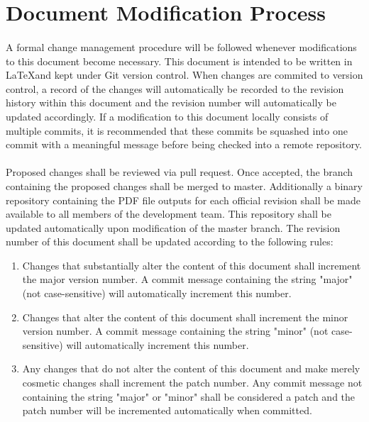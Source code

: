 \section{Document Modification Process}
\paragraph*{}
    A formal change management procedure will be followed whenever modifications
    to this document become necessary. This document is intended to be written in
    \LaTeX and kept under
    Git version control. When changes are commited to version control, a record
    of the changes will automatically be recorded to the revision history within this document and the
    revision number will automatically be updated accordingly. If a modification to this document
    locally consists of multiple commits, it is recommended that these commits be
    squashed into one commit with a meaningful message before being checked into a
    remote repository.

\paragraph*{}
    Proposed changes shall be reviewed via pull request. Once
    accepted, the branch containing the proposed changes shall be merged to master. 
    Additionally a binary repository containing the PDF file outputs for each official revision
    shall be made available to all members of the development team. This repository
    shall be updated automatically upon modification of the master branch. The revision     number of this document shall be updated according to the following rules:

    \begin{enumerate}
        \item Changes that substantially alter the content of this document shall
                increment the major version number. A commit message containing the
                string "major" (not case-sensitive) will automatically increment this
                number.
        \item Changes that alter the content of this document shall increment the
                minor version number. A commit message containing the string "minor"
                (not case-sensitive) will automatically increment this number.
        \item Any changes that do not alter the content of this document and make
                merely cosmetic changes shall increment the patch number.
                Any commit message not containing the string "major" or "minor" shall be
                considered a patch and the patch number will be
                incremented automatically when committed.
    \end{enumerate}
